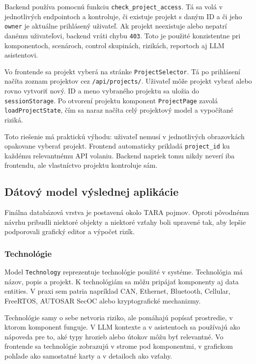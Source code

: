 \documentclass[11pt]{article}
\begin{document}
Backend používa pomocnú funkciu \texttt{check\_project\_access}. Tá sa volá v jednotlivých endpointoch a kontroluje, či existuje projekt s daným ID a či jeho \texttt{owner} je aktuálne prihlásený uživateľ. Ak projekt neexistuje alebo nepatrí danému uživateľovi, backend vráti chybu \texttt{403}. Toto je použité konzistentne pri komponentoch, scenároch, control skupinách, rizikách, reportoch aj LLM asistentovi.

Vo frontende sa projekt vyberá na stránke \texttt{ProjectSelector}. Tá po prihlásení načíta zoznam projektov cez \texttt{/api/projects/}. Uživateľ môže projekt vybrať alebo rovno vytvoriť nový. ID a meno vybraného projektu sa uložia do \texttt{sessionStorage}. Po otvorení projektu komponent \texttt{ProjectPage} zavolá \texttt{loadProjectState}, čím sa naraz načíta celý projektový model a vypočítané riziká.

Toto riešenie má praktickú výhodu: uživateľ nemusí v jednotlivých obrazovkách opakovane vyberať projekt. Frontend automaticky prikladá \texttt{project\_id} ku každému relevantnému API volaniu. Backend napriek tomu nikdy neverí iba frontendu, ale vlastníctvo projektu kontroluje sám.

\subsection{Dátový model výslednej aplikácie}

Finálna databázová vrstva je postavená okolo TARA pojmov. Oproti pôvodnému návrhu pribudli niektoré objekty a niektoré vzťahy boli upravené tak, aby lepšie podporovali grafický editor a výpočet rizík.

\subsubsection{Technológie}

Model \texttt{Technology} reprezentuje technológie použité v systéme. Technológia má názov, popis a projekt. K technológiám sa môžu pripájať komponenty aj data entities. V praxi sem patria napríklad CAN, Ethernet, Bluetooth, Cellular, FreeRTOS, AUTOSAR SecOC alebo kryptografické mechanizmy.

Technológie samy o sebe netvoria riziko, ale pomáhajú popísať prostredie, v ktorom komponent funguje. V LLM kontexte a v asistentoch sa používajú ako nápoveda pre to, aké typy hrozieb alebo útokov môžu byť relevantné. Vo frontende sa technológie zobrazujú v strome pod komponentmi, v grafickom pohľade ako samostatné karty a v detailoch ako vzťahy.
\end{document}
